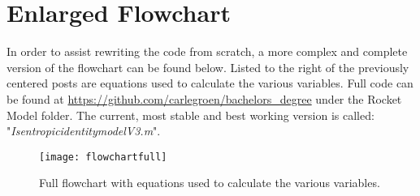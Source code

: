 \chapter{Enlarged Flowchart} \label{App:C}

	In order to assist rewriting the code from scratch, a more complex and complete version of the flowchart can be found below. Listed to the right of the previously centered posts are equations used to calculate the various variables. Full code can be found at \url{https://github.com/carlegroen/bachelors_degree} under the Rocket Model folder. The current, most stable and best working version is called: "\emph{IsentropicidentitymodelV3.m}".

		\begin{figure}
			\centering
			\texttt{[image: flowchartfull]}
			\caption{Full flowchart with equations used to calculate the various variables.}
			\label{fig:flowchartfull}
		\end{figure}